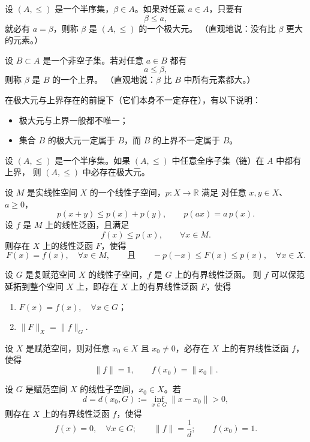 \begin{definition}[极大元]
设 $(A,\leq)$ 是一个半序集，$\beta\in A$。如果对任意 $a\in A$，只要有
\[
\beta\leq a,
\]
就必有 $a=\beta$，则称 $\beta$ 是 $(A,\leq)$ 的一个极大元。
（直观地说：没有比 $\beta$ 更大的元素。）
\end{definition}

\begin{definition}[上界]
设 $B\subset A$ 是一个非空子集。若对任意 $a\in B$ 都有
\[
a\leq \beta,
\]
则称 $\beta$ 是 $B$ 的一个上界。
（直观地说：$\beta$ 比 $B$ 中所有元素都大。）
\end{definition}

在极大元与上界存在的前提下（它们本身不一定存在），有以下说明：
\begin{itemize}
  \item 极大元与上界一般都不唯一；
  \item 集合 $B$ 的极大元一定属于 $B$，而 $B$ 的上界不一定属于 $B$。
\end{itemize}

\begin{theorem}[Zorn 引理]\label{thm:Zorn}
设 $(A,\leq)$ 是一个半序集。如果 $(A,\leq)$ 中任意全序子集（链）在 $A$ 中都有上界，
则 $(A,\leq)$ 中必存在极大元。
\end{theorem}
\begin{theorem}\label{thm:HB-real}
设 $M$ 是实线性空间 $X$ 的一个线性子空间，$p:X\to\mathbb{R}$ 满足  
对任意 $x,y\in X$、$a\ge0$，
\[
p(x+y)\le p(x)+p(y),\qquad p(ax)=a\,p(x).
\]
设 $f$ 是 $M$ 上的线性泛函，且满足
\[
f(x)\le p(x),\qquad \forall x\in M.
\]
则存在 $X$ 上的线性泛函 $F$，使得
\[
F(x)=f(x),\quad \forall x\in M,
\qquad\text{且}\qquad
-p(-x)\le F(x)\le p(x),\quad \forall x\in X.
\]
\end{theorem}
\begin{theorem}\label{thm:HB-norm}
设 $G$ 是复赋范空间 $X$ 的线性子空间，$f$ 是 $G$ 上的有界线性泛函。
则 $f$ 可以保范延拓到整个空间 $X$ 上，即存在 $X$ 上的有界线性泛函
$F$，使得
\begin{enumerate}
  \item $F(x)=f(x),\quad \forall x\in G$；
  \item $\|F\|_{X}=\|f\|_{G}$.
\end{enumerate}
\end{theorem}

\begin{corollary}\label{cor:HB-support}
设 $X$ 是赋范空间，则对任意 $x_0\in X$ 且 $x_0\neq0$，必存在
$X$ 上的有界线性泛函 $f$，使得
\[
\|f\|=1,\qquad f(x_0)=\|x_0\|.
\]
\end{corollary}
\begin{corollary}\label{cor:HB-distance}
设 $G$ 是赋范空间 $X$ 的线性子空间，$x_0\in X$。若
\[
d=d(x_0,G):=\inf_{x\in G}\|x-x_0\|>0,
\]
则存在 $X$ 上的有界线性泛函 $f$，使得
\[
f(x)=0,\quad \forall x\in G;\qquad
\|f\|=\frac1d;\qquad
f(x_0)=1.
\]
\end{corollary}

